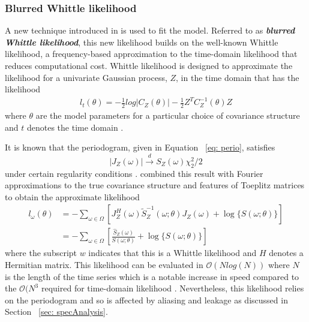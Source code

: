 \documentclass{stat572Style}
\begin{document}
\subsubsection{Blurred Whittle likelihood}
A new technique introduced in  \citet{Sykulski2013}  is used to fit the model.
 Referred to as \textbf{\it{blurred Whittle likelihood}}, this new likelihood builds on the well-known Whittle likelihood, a frequency-based approximation  to the time-domain likelihood that reduces computational cost. 
  Whittle likelihood is designed to approximate the likelihood for a univariate Gaussian process, $Z$,  in the time domain that has the likelihood
\begin{align*}
l_{t}(\theta) = - \frac{1}{2} log |C_{Z}(\theta) | - \frac{1}{2} Z^{T} C_{Z}^{-1}(\theta)Z
\end{align*}
where $\theta$ are the model parameters for a particular choice of covariance structure  and $t$ denotes the time domain  \citep{Sykulski2013}. 

 It is known that  the periodogram, given in Equation ~\ref{eq: perio}, satisfies
\begin{equation}
|J_{Z}(\omega)| \overset{d}{\rightarrow} S_{Z}(\omega) \chi^{2}_{2}/2
\end{equation}
under certain regularity conditions \citep{Contreras2006}. 
\citet{Whittle1953} combined this result with Fourier approximations to the true covariance structure and features of Toeplitz matrices to obtain the approximate likelihood
\begin{align}
l_{\omega}(\theta) &= - \sum_{\omega \in \Omega} \left[ J_{Z}^{H}(\omega) \tilde{S}_{Z}^{-1}(\omega; \theta) J_{Z}(\omega) + \log \{S(\omega; \theta) \} \right]\\
\label{eq: bwl}
&= -\sum_{\omega \in \Omega} \left[ \frac{\hat{S}_{Z}(\omega)}{S(\omega;\theta)}  + \log  \{ S(\omega; \theta) \}\right]
\end{align}
 where the subscript $w$ indicates that this is a Whittle likelihood and $H$ denotes a Hermitian matrix. 
  This likelihood can be evaluated in $\mathcal{O}(N log(N))$ where $N$ is the length of the time series which is a notable increase in speed compared to the $\mathcal{O}(N^{3}$  required for time-domain likelihood  \citep{Sykulski2016}. 
  Nevertheless, this likelihood relies on the periodogram and so is affected by aliasing and leakage as discussed in Section ~\ref{sec: specAnalysis}. 
 
\end{document}

